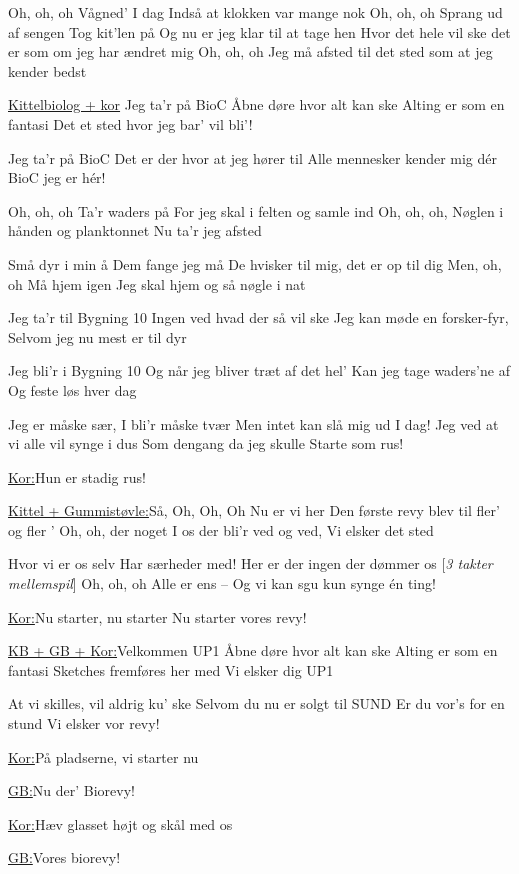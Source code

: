 \documentclass[a4paper,12pt]{article}
\begin{document}
\begin{song}


Oh, oh, oh
Vågned' I dag
Indså at klokken var mange nok
Oh, oh, oh
Sprang ud af sengen
Tog kit'len på
Og nu er jeg klar
til at tage hen
Hvor det hele vil ske
det er som om jeg har
ændret mig
Oh, oh, oh
Jeg må afsted
til det sted som at jeg
kender bedst
	
\underline{Kittelbiolog + kor}
Jeg ta'r på BioC
Åbne døre hvor alt kan ske
Alting er som en fantasi
Det et sted hvor jeg bar' vil bli'!
	
Jeg ta'r på BioC
Det er der hvor at jeg hører til
Alle mennesker kender mig dér
BioC jeg er hér!
	
Oh, oh, oh
Ta'r waders på
For jeg skal i felten og samle ind
Oh, oh, oh,
Nøglen i hånden og planktonnet
Nu ta'r jeg afsted
	
Små dyr i min å
Dem fange jeg må
De hvisker til
mig, det er op til dig
Men, oh, oh
Må hjem igen
Jeg skal hjem og så nøgle i nat
	
Jeg ta'r til Bygning 10
Ingen ved hvad der så vil ske
Jeg kan møde en forsker-fyr,
Selvom jeg nu mest er til dyr	
	
Jeg bli'r i Bygning 10
Og når jeg bliver træt af det hel'
Kan jeg tage waders'ne af
Og feste løs hver dag
	
Jeg er måske sær,
I bli'r måske tvær
Men intet kan slå mig ud I dag!
Jeg ved at vi alle vil synge i dus
Som dengang da jeg skulle
Starte som rus!
	
\underline{Kor:}Hun er stadig rus!
	
\underline{Kittel + Gummistøvle:}Så, Oh, Oh, Oh
Nu er vi her
Den første revy blev til fler' og fler '
Oh, oh, der
noget I os der bli'r ved og ved,
Vi elsker det sted
	
Hvor vi er os selv
Har særheder med!
Her er der ingen der dømmer os
[\textit{3 takter mellemspil}]	
Oh, oh, oh	
Alle er ens
-- Og vi kan sgu kun synge én ting!
	
\underline{Kor:}Nu starter, nu starter
Nu starter vores revy!
	
\underline{KB + GB + Kor:}Velkommen UP1
Åbne døre hvor alt kan ske
Alting er som en fantasi
Sketches fremføres her med 
Vi elsker dig UP1
	
At vi skilles,
vil aldrig ku' ske
Selvom du nu er solgt til SUND
Er du vor's for en stund
Vi elsker vor revy!
	
\underline{Kor:}På pladserne, vi starter nu
	
\underline{GB:}Nu der' Biorevy!
	
\underline{Kor:}Hæv glasset højt og skål med os	
	
\underline{GB:}Vores biorevy!


\end{song}
\end{document}

